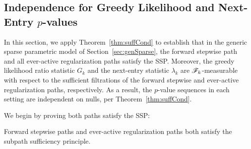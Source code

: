 \documentclass{article}
\begin{document}
\subsection{Independence for Greedy Likelihood and Next-Entry $p$-values}\label{sec:indep-greedy-entry}

In this section, we apply Theorem~\ref{thm:suffCond} to establish that in the generic sparse parametric model of Section~\ref{sec:genSparse}, the forward stepwise path and all ever-active regularization paths satisfy the SSP. Moreover, the greedy likelihood ratio statistic $G_k$ and the next-entry statistic $\lambda_k$ are $\mathscr{F}_k$-measurable with respect to the sufficient filtrations of the forward stepwise and ever-active regularization paths, respectively. As a result, the $p$-value sequences in each setting are independent on nulls, per Theorem~\ref{thm:suffCond}.

We begin by proving both paths satisfy the SSP:
\begin{proposition}\label{prop:forwardSSP}
Forward stepwise paths and ever-active regularization paths both satisfy the subpath sufficiency principle.
\end{proposition}
\end{document}

